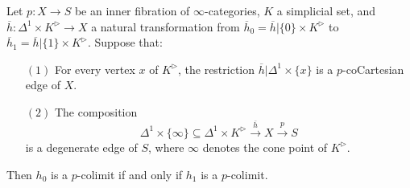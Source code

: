 \begin{proposition}\label{chocolatelast}
Let $p: X \rightarrow S$ be an inner fibration of $\infty$-categories, $K$ a simplicial set, and
$\overline{h}: \Delta^1 \times K^{\triangleright} \rightarrow X$ a natural transformation from
$\overline{h}_0 = \overline{h} | \{0\} \times K^{\triangleright}$ to $\overline{h}_1 = \overline{h} | \{1\} \times K^{\triangleright}$.
Suppose that:
\begin{itemize}
\item[$(1)$] For every vertex $x$ of $K^{\triangleright}$, the restriction
$\overline{h} | \Delta^1 \times \{x\}$ is a $p$-coCartesian edge of $X$.
\item[$(2)$] The composition
$$ \Delta^1 \times \{\infty\} \subseteq \Delta^1 \times K^{\triangleright}
\stackrel{\overline{h}}{\rightarrow} X \stackrel{p}{\rightarrow} S$$
is a degenerate edge of $S$, where $\infty$ denotes the cone point of
$K^{\triangleright}$.
\end{itemize}

Then $h_0$ is a $p$-colimit if and only if $h_1$ is a $p$-colimit.
\end{proposition}

